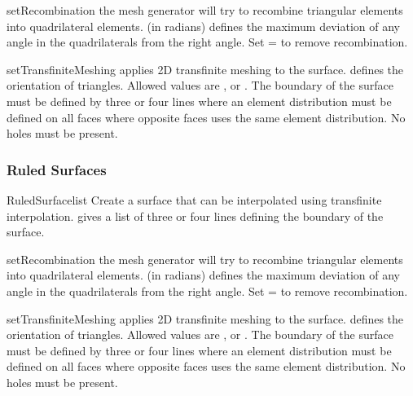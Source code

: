 \begin{methoddesc}[PlaneSurface]{setRecombination}{}
the mesh generator will try to recombine triangular elements
into quadrilateral elements.  (in radians) defines the
maximum deviation of any angle in the quadrilaterals from the right angle.
Set = to remove recombination.
\end{methoddesc}
\begin{methoddesc}[PlaneSurface]{setTransfiniteMeshing}{}
applies 2D transfinite meshing to the surface.
 defines the orientation of triangles. Allowed values
are ,  or . The
boundary of the surface must be defined by three or four lines where an
element distribution must be defined on all faces where opposite
faces uses the same element distribution. No holes must be present.
\end{methoddesc}



\subsubsection{Ruled Surfaces}
\begin{classdesc}{RuledSurface}{list}
Create a surface that can be interpolated using transfinite interpolation.
 gives a list of three or four lines defining the boundary of the
surface.
\end{classdesc}

\begin{methoddesc}[RuledSurface]{setRecombination}{}
the mesh generator will try to recombine triangular elements
into quadrilateral elements.  (in radians) defines the
maximum deviation of any angle in the quadrilaterals from the right angle.
Set = to remove recombination.
\end{methoddesc}

\begin{methoddesc}[RuledSurface]{setTransfiniteMeshing}{}
applies 2D transfinite meshing to the surface.
 defines the orientation of triangles. Allowed values
are ,  or . The
boundary of the surface must be defined by three or four lines where an
element distribution must be defined on all faces where opposite
faces uses the same element distribution. No holes must be present.
\end{methoddesc}


